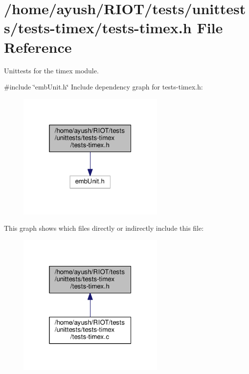 \hypertarget{tests-timex_8h}{}\section{/home/ayush/\+R\+I\+O\+T/tests/unittests/tests-\/timex/tests-\/timex.h File Reference}
\label{tests-timex_8h}


Unittests for the {\ttfamily timex} module.  


{\ttfamily \#include \char`\"{}emb\+Unit.\+h\char`\"{}}\newline
Include dependency graph for tests-\/timex.h\+:
\nopagebreak
\begin{figure}[H]
\begin{center}
\leavevmode
\includegraphics[width=205pt]{tests-timex_8h__incl}
\end{center}
\end{figure}
This graph shows which files directly or indirectly include this file\+:
\nopagebreak
\begin{figure}[H]
\begin{center}
\leavevmode
\includegraphics[width=205pt]{tests-timex_8h__dep__incl}
\end{center}
\end{figure}

